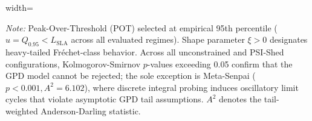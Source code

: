 \begin{table}[t]
\begin{adjustbox}{width=\textwidth}
\end{adjustbox}
\begin{tablenotes}
\item \footnotesize{\textit{Note:} Peak-Over-Threshold (POT) selected at empirical 95th percentile ($u = Q_{0.95} < L_{\text{SLA}}$ across all evaluated regimes). Shape parameter $\xi > 0$ designates heavy-tailed Fr\'{e}chet-class behavior. Across all unconstrained and PSI-Shed configurations, Kolmogorov-Smirnov $p$-values exceeding 0.05 confirm that the GPD model cannot be rejected; the sole exception is Meta-Senpai ($p < 0.001, A^2 = 6.102$), where discrete integral probing induces oscillatory limit cycles that violate asymptotic GPD tail assumptions. $A^2$ denotes the tail-weighted Anderson-Darling statistic.}
\end{tablenotes}
\end{table}
